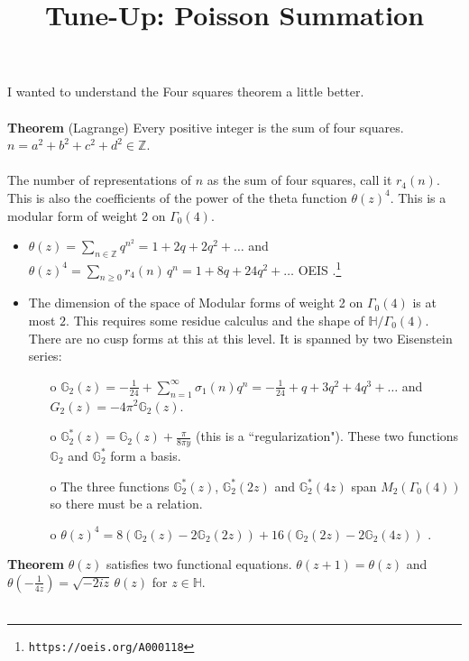 \documentclass[12pt]{article}
\title{Tune-Up: Poisson Summation}
\date{}
\begin{document}
\sffamily

\maketitle

\noindent I wanted to understand the Four squares theorem a little better.  \\ \\
\textbf{Theorem} (Lagrange) Every positive integer is the sum of four squares.  $n = a^2 + b^2 + c^2 + d^2 \in \mathbb{Z}$. \\ \\
The number of representations of $n$ as the sum of four squares, call it $r_4(n)$.  This is also the coefficients of the power of the theta function $\theta(z)^4$.  This is a modular form of weight $2$ on $\Gamma_0(4)$. 
\begin{itemize}
\item $\displaystyle \theta(z) = \sum_{n \in \mathbb{Z}} q^{n^2} = 1 + 2q + 2q^2 + \dots $ and $\displaystyle \theta(z)^4 = \sum_{n \geq 0} r_4(n) \, q^n = 1 + 8q + 24q^2 + \dots $ OEIS .\footnote{\texttt{https://oeis.org/A000118}}
\item The dimension of the space of Modular forms of weight 2 on $\Gamma_0(4)$ is at most $2$.  This requires some residue calculus and the shape of $\mathbb{H}/\Gamma_0(4)$.  There are no cusp forms at this at this level.  It is spanned by two Eisenstein series:
\begin{itemize}
\item[o] $\mathbb{G}_2(z)=- \frac{1}{24} + \sum_{n=1}^\infty \sigma_{1}(n) q^n
= - \frac{1}{24} + q + 3q^2 + 4q^3 + \dots $ and $G_2(z) = - 4\pi^2 \mathbb{G}_2(z)$. \\
\item[o] $\displaystyle \mathbb{G}_2^\ast(z) = \mathbb{G}_2(z) + \frac{\pi}{8\pi y}$ (this is a ``regularization").  These two functions $\mathbb{G}_2$ and $\mathbb{G}^*_2$ form a basis.
\item[o] The three functions $\mathbb{G}^*_2(z)$, $\mathbb{G}^*_2(2z)$ and $\mathbb{G}^*_2(4z)$ span $M_2(\Gamma_0(4))$ so there must be a relation.\\
\item[o] $\theta(z)^4 = 8(\mathbb{G}_2(z) - 2 \mathbb{G}_2(2z)) + 16(\mathbb{G}_2(2z) - 2 \mathbb{G}_2(4z))$ .
\end{itemize}
\end{itemize}
\textbf{Theorem} $\theta(z)$ satisfies two functional equations.  $\theta(z+1) = \theta(z)$ and $\theta(- \frac{1}{4z}) = \sqrt{-2iz}\,\theta(z) $ for $z \in \mathbb{H}$.  \\ \\
\end{document}
